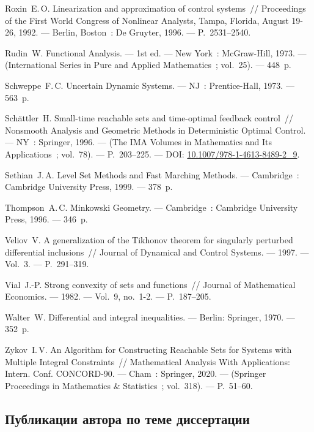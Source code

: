 \documentclass[../main.tex]{subfiles}
\begin{document}
\begin{thebibliography}{99}
Roxin~E.\,O. Linearization and approximation of control systems~// Proceedings of the First World Congress of Nonlinear Analysts, Tampa, Florida, August 19-26, 1992. --- Berlin, Boston~: De Gruyter, 1996. --- P.~2531--2540. 

Rudin~W. Functional Analysis. --- 1st ed. --- New York~: McGraw-Hill, 1973. --- (International Series in Pure and Applied Mathematics~; vol.~25). --- 448~p.

Schweppe~F.\,C. Uncertain Dynamic Systems. --- NJ~: Prentice-Hall, 1973. --- 563~p.

Sch\"{a}ttler~H. Small-time reachable sets and time-optimal feedback control~// Nonsmooth Analysis and Geometric Methods in Deterministic Optimal Control. --- NY~: Springer, 1996. --- (The IMA Volumes in Mathematics and Its Applications~; vol.~78). --- P.~203--225. --- DOI: \href{https://doi.org/10.1007/978-1-4613-8489-2_9}{10.1007/978-1-4613-8489-2\_9}.

Sethian~J.\,A. Level Set Methods and Fast Marching Methods. --- Cambridge~: Cambridge University Press, 1999. --- 378~p.

Thompson~A.\,C. Minkowski Geometry. --- Cambridge~: Cambridge University Press, 1996. --- 346~p.

Veliov~V. A generalization of the Tikhonov theorem for singularly perturbed differential inclusions~// Journal of Dynamical and Control Systems. --- 1997. --- Vol.~3. --- P.~291--319.

Vial~J.-P. Strong convexity of sets and functions~// Journal of Mathematical Economics. --- 1982. --- Vol.~9, no.~1-2. --- P.~187--205.  

Walter~W. Differential and integral inequalities. --- Berlin: Springer, 1970. --- 352~p.

Zykov~I.\,V. An Algorithm for Constructing Reachable Sets for Systems with Multiple Integral Constraints~// Mathematical Analysis With Applications: Intern. Conf. CONCORD-90. --- Cham~: Springer, 2020. --- (Springer Proceedings in Mathematics \& Statistics~; vol.~318). --- P.~51--60. 

\subsection*{Публикации автора по теме диссертации}

\end{thebibliography}
\end{document}

